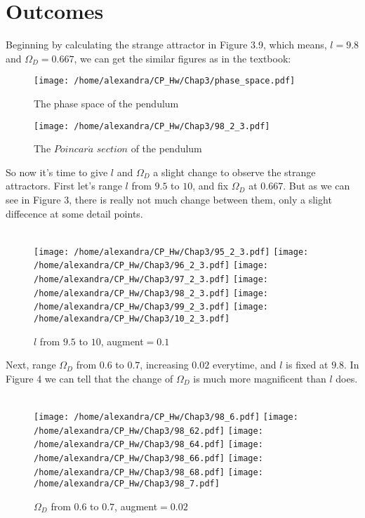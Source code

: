 \documentclass{article}
\begin{document}
\section{Outcomes}
Beginning by calculating the strange attractor in Figure 3.9, which means, $l=9.8$ and $\Omega_D=0.667$, we can get the similar figures as in the textbook:
\begin{figure}[htbp]
\centering
\texttt{[image: /home/alexandra/CP\_Hw/Chap3/phase\_space.pdf]}
\caption{The phase space of the pendulum}
\end{figure}
\begin{figure}[htbp]
\centering
\texttt{[image: /home/alexandra/CP\_Hw/Chap3/98\_2\_3.pdf]}
\caption{The $Poincar\acute{a}$ $section$ of the pendulum}
\end{figure}
\newpage
So now it's time to give $l$ and $\Omega_D$ a slight change to observe the strange attractors. First let's range $l$ from $9.5$ to $10$, and fix $\Omega_D$ at $0.667$. But as we can see in Figure 3, there is really not much change between them, only a slight diffecence at some detail points.\\\\
\begin{figure}[htbp]
\centering
\texttt{[image: /home/alexandra/CP\_Hw/Chap3/95\_2\_3.pdf]}
\texttt{[image: /home/alexandra/CP\_Hw/Chap3/96\_2\_3.pdf]}
\texttt{[image: /home/alexandra/CP\_Hw/Chap3/97\_2\_3.pdf]}
\texttt{[image: /home/alexandra/CP\_Hw/Chap3/98\_2\_3.pdf]}
\texttt{[image: /home/alexandra/CP\_Hw/Chap3/99\_2\_3.pdf]}
\texttt{[image: /home/alexandra/CP\_Hw/Chap3/10\_2\_3.pdf]}
\caption{$l$ from $9.5$ to $10$, augment$=0.1$}
\end{figure}
\newpage
Next, range $\Omega_D$ from $0.6$ to $0.7$, increasing $0.02$ everytime, and $l$ is fixed at $9.8$. In Figure 4 we can tell that the change of $\Omega_D$ is much more magnificent than $l$ does.\\\\
\begin{figure}[htbp]
\centering
\texttt{[image: /home/alexandra/CP\_Hw/Chap3/98\_6.pdf]}
\texttt{[image: /home/alexandra/CP\_Hw/Chap3/98\_62.pdf]}
\texttt{[image: /home/alexandra/CP\_Hw/Chap3/98\_64.pdf]}
\texttt{[image: /home/alexandra/CP\_Hw/Chap3/98\_66.pdf]}
\texttt{[image: /home/alexandra/CP\_Hw/Chap3/98\_68.pdf]}
\texttt{[image: /home/alexandra/CP\_Hw/Chap3/98\_7.pdf]}
\caption{$\Omega_D$ from $0.6$ to $0.7$, augment$=0.02$}
\end{figure}
\end{document}
